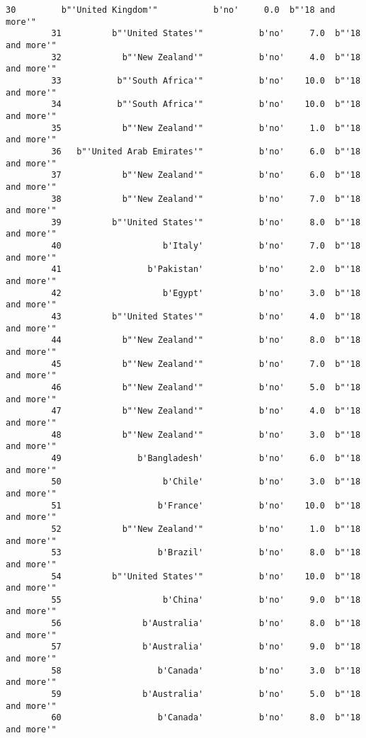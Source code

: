 \documentclass[11pt]{article}
\begin{document}
\begin{Verbatim}[commandchars=\\\{\}]
         30         b"'United Kingdom'"           b'no'     0.0  b"'18 and more'"   
         31          b"'United States'"           b'no'     7.0  b"'18 and more'"   
         32            b"'New Zealand'"           b'no'     4.0  b"'18 and more'"   
         33           b"'South Africa'"           b'no'    10.0  b"'18 and more'"   
         34           b"'South Africa'"           b'no'    10.0  b"'18 and more'"   
         35            b"'New Zealand'"           b'no'     1.0  b"'18 and more'"   
         36   b"'United Arab Emirates'"           b'no'     6.0  b"'18 and more'"   
         37            b"'New Zealand'"           b'no'     6.0  b"'18 and more'"   
         38            b"'New Zealand'"           b'no'     7.0  b"'18 and more'"   
         39          b"'United States'"           b'no'     8.0  b"'18 and more'"   
         40                    b'Italy'           b'no'     7.0  b"'18 and more'"   
         41                 b'Pakistan'           b'no'     2.0  b"'18 and more'"   
         42                    b'Egypt'           b'no'     3.0  b"'18 and more'"   
         43          b"'United States'"           b'no'     4.0  b"'18 and more'"   
         44            b"'New Zealand'"           b'no'     8.0  b"'18 and more'"   
         45            b"'New Zealand'"           b'no'     7.0  b"'18 and more'"   
         46            b"'New Zealand'"           b'no'     5.0  b"'18 and more'"   
         47            b"'New Zealand'"           b'no'     4.0  b"'18 and more'"   
         48            b"'New Zealand'"           b'no'     3.0  b"'18 and more'"   
         49               b'Bangladesh'           b'no'     6.0  b"'18 and more'"   
         50                    b'Chile'           b'no'     3.0  b"'18 and more'"   
         51                   b'France'           b'no'    10.0  b"'18 and more'"   
         52            b"'New Zealand'"           b'no'     1.0  b"'18 and more'"   
         53                   b'Brazil'           b'no'     8.0  b"'18 and more'"   
         54          b"'United States'"           b'no'    10.0  b"'18 and more'"   
         55                    b'China'           b'no'     9.0  b"'18 and more'"   
         56                b'Australia'           b'no'     8.0  b"'18 and more'"   
         57                b'Australia'           b'no'     9.0  b"'18 and more'"   
         58                   b'Canada'           b'no'     3.0  b"'18 and more'"   
         59                b'Australia'           b'no'     5.0  b"'18 and more'"   
         60                   b'Canada'           b'no'     8.0  b"'18 and more'"   

\end{Verbatim}
\end{document}
